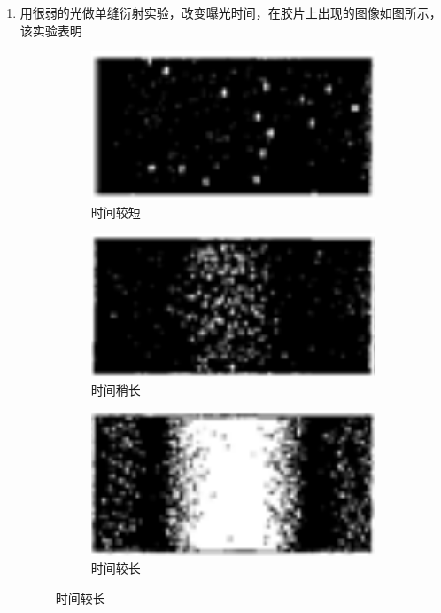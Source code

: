 

\begin{enumerate}
	\item
{}
 用很弱的光做单缝衍射实验，改变曝光时间，在胶片上出现的图像如图所示，
该实验表明  
\begin{figure}[h!]
	\centering
	\begin{subfigure}{0.22\linewidth}
		\centering
		\includegraphics[width=0.85\linewidth]{picture/screenshot076}
		\caption{时间较短}\label{}
	\end{subfigure}
	\begin{subfigure}{0.22\linewidth}
		\centering
		\includegraphics[width=0.85\linewidth]{picture/screenshot077}
		\caption{时间稍长}\label{}
	\end{subfigure}
	\begin{subfigure}{0.22\linewidth}
		\centering
		\includegraphics[width=0.85\linewidth]{picture/screenshot078}
		\caption{时间较长}\label{}
	\end{subfigure}
\end{figure}




\end{enumerate}
